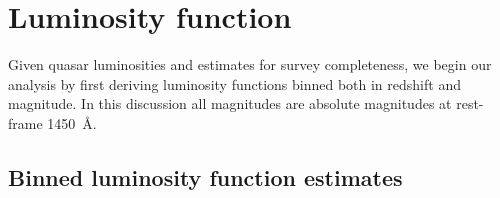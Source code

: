\documentclass[a4paper,fleqn,usenatbib]{mnras}
\begin{document}


\section{Luminosity function}

Given quasar luminosities and estimates for survey completeness, we
begin our analysis by first deriving luminosity functions binned both
in redshift and magnitude.  In this discussion all magnitudes are
absolute magnitudes at rest-frame 1450~{\AA}.


\subsection{Binned luminosity function estimates}
\end{document}
